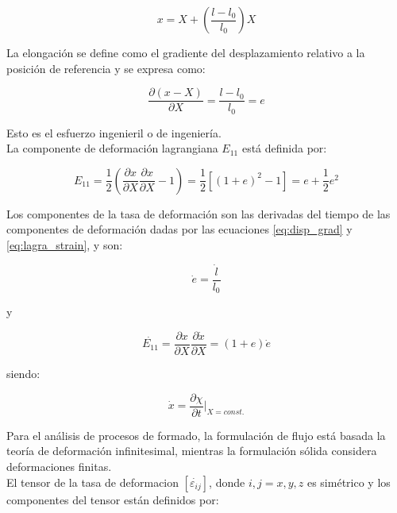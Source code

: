 \begin{equation}
x = X + \left( \frac{l-l_0}{l_0} \right) X
\end{equation}

La elongación se define como el gradiente del desplazamiento relativo a la posición 
de referencia y se expresa como:

\begin{equation} \label{eq:disp_grad}
\frac{\partial (x-X)}{\partial X} = \frac{l-l_0}{l_0} = e
\end{equation}

Esto es el esfuerzo ingenieril o de ingeniería. \\

La componente de deformación lagrangiana $E_{11}$ está definida por:

\begin{equation} \label{eq:lagra_strain}
E_{11} = \frac{1}{2} \left( \frac{\partial x}{\partial X} \frac{\partial x}{\partial X} - 1 \right) = 
\frac{1}{2} \left[ (1+e)^2 - 1 \right] = e + \frac{1}{2} e^2
\end{equation}


Los componentes de la tasa de deformación son las derivadas del tiempo de las componentes 
de deformación dadas por las ecuaciones \ref{eq:disp_grad} y \ref{eq:lagra_strain}, y son:

\begin{equation}
\dot{e} = \frac{\dot{l}}{l_0}
\end{equation}

y 

\begin{equation}
\dot{E_{11}} = \frac{\partial x}{\partial X} \frac{\partial \dot{x}}{\partial X} = 
(1+e)\dot{e}
\end{equation}

siendo:

\begin{equation}
\dot{x} = \frac{\partial \chi}{\partial t} \Big\rvert_{X = const.}
\end{equation}

Para el análisis de procesos de formado, la formulación de flujo está basada la teoría 
de deformación infinitesimal, mientras la formulación sólida considera deformaciones 
finitas. \\

El tensor de la tasa de deformacion $[\dot{\varepsilon_{ij}}]$, donde $i,j = x,y,z$ es simétrico 
y los componentes del tensor están definidos por: 

